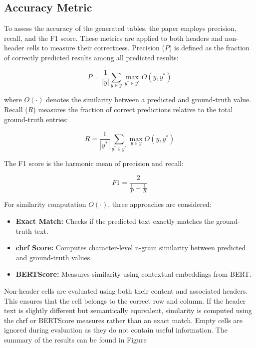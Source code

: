 \documentclass[12pt,a4paper]{article}
\begin{document}
\subsection*{Accuracy Metric}

To assess the accuracy of the generated tables, the paper employs precision, recall, and the F1 score. These metrics are applied to both headers and non-header cells to measure their correctness. Precision (\( P \)) is defined as the fraction of correctly predicted results among all predicted results:

\[
P = \frac{1}{|y|} \sum_{y \in y} \max_{y^* \in y^*} O(y, y^*)
\]

where \( O(\cdot) \) denotes the similarity between a predicted and ground-truth value. Recall (\( R \)) measures the fraction of correct predictions relative to the total ground-truth entries:

\[
R = \frac{1}{|y^*|} \sum_{y^* \in y^*} \max_{y \in y} O(y, y^*)
\]

The F1 score is the harmonic mean of precision and recall:

\[
F1 = \frac{2}{\frac{1}{P} + \frac{1}{R}}
\]

For similarity computation \( O(\cdot) \), three approaches are considered:
\begin{itemize}
    \item \textbf{Exact Match:} Checks if the predicted text exactly matches the ground-truth text.
    \item \textbf{chrf Score:} Computes character-level n-gram similarity between predicted and ground-truth values.
    \item \textbf{BERTScore:} Measures similarity using contextual embeddings from BERT.
\end{itemize}

Non-header cells are evaluated using both their content and associated headers. This ensures that the cell belongs to the correct row and column. If the header text is slightly different but semantically equivalent, similarity is computed using the chrf or BERTScore measures rather than an exact match. Empty cells are ignored during evaluation as they do not contain useful information. The summary of the results can be found in Figure 
\end{document}
